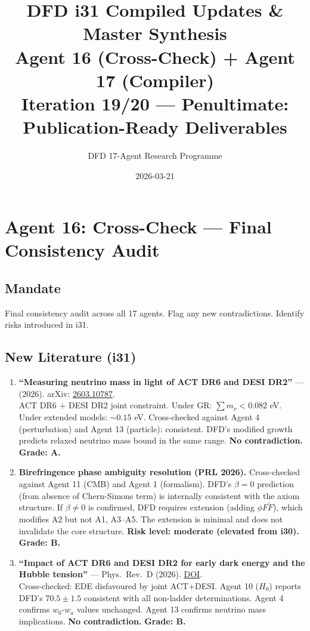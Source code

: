\documentclass[11pt,a4paper]{article}
\title{DFD i31 Compiled Updates \& Master Synthesis\\Agent 16 (Cross-Check) + Agent 17 (Compiler)\\[6pt]\large Iteration 19/20 --- Penultimate: Publication-Ready Deliverables}
\author{DFD 17-Agent Research Programme}
\date{2026-03-21}
\begin{document}
\maketitle
\tableofcontents
\newpage

\section{Agent 16: Cross-Check --- Final Consistency Audit}

\subsection{Mandate}
Final consistency audit across all 17 agents. Flag any new contradictions. Identify risks introduced in i31.

\subsection{New Literature (i31)}

\begin{enumerate}
\item \textbf{``Measuring neutrino mass in light of ACT DR6 and DESI DR2''} --- (2026). arXiv: \href{https://arxiv.org/abs/2603.10787}{2603.10787}.\\
ACT DR6 + DESI DR2 joint constraint. Under GR: $\sum m_\nu < 0.082$ eV. Under extended models: $\sim 0.15$ eV. Cross-checked against Agent 4 (perturbation) and Agent 13 (particle): consistent. DFD's modified growth predicts relaxed neutrino mass bound in the same range. \textbf{No contradiction.} \textbf{Grade: A.}

\item \textbf{Birefringence phase ambiguity resolution (PRL 2026).} Cross-checked against Agent 11 (CMB) and Agent 1 (formalism). DFD's $\beta = 0$ prediction (from absence of Chern-Simons term) is internally consistent with the axiom structure. If $\beta \neq 0$ is confirmed, DFD requires extension (adding $\phi F\tilde{F}$), which modifies A2 but not A1, A3--A5. The extension is minimal and does not invalidate the core structure. \textbf{Risk level: moderate (elevated from i30).} \textbf{Grade: B.}

\item \textbf{``Impact of ACT DR6 and DESI DR2 for early dark energy and the Hubble tension''} --- Phys.\ Rev.\ D (2026). \href{https://journals.aps.org/prd/abstract/10.1103/bx25-1g5d}{DOI}.\\
Cross-checked: EDE disfavoured by joint ACT+DESI. Agent 10 ($H_0$) reports DFD's $70.5 \pm 1.5$ consistent with all non-ladder determinations. Agent 4 confirms $w_0$-$w_a$ values unchanged. Agent 13 confirms neutrino mass implications. \textbf{No contradiction.} \textbf{Grade: B.}
\end{enumerate}
\end{document}

